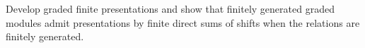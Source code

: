 \begin{problem}\label{chal:vi34-04}
Develop graded finite presentations and show that finitely generated graded modules admit presentations by finite direct sums of shifts when the relations are finitely generated.
\end{problem}
